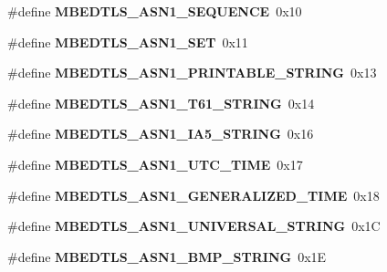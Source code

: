 \begin{DoxyCompactItemize}
\item 
\hypertarget{group__asn1__module_ga64ce838eb4418e69fe9aa251436203b3}{\#define {\bfseries M\-B\-E\-D\-T\-L\-S\-\_\-\-A\-S\-N1\-\_\-\-S\-E\-Q\-U\-E\-N\-C\-E}~0x10}\label{group__asn1__module_ga64ce838eb4418e69fe9aa251436203b3}

\item 
\hypertarget{group__asn1__module_ga67afaa83253889dacb9fcb47062162c5}{\#define {\bfseries M\-B\-E\-D\-T\-L\-S\-\_\-\-A\-S\-N1\-\_\-\-S\-E\-T}~0x11}\label{group__asn1__module_ga67afaa83253889dacb9fcb47062162c5}

\item 
\hypertarget{group__asn1__module_ga57f497984e573597e1ed100afcc3f965}{\#define {\bfseries M\-B\-E\-D\-T\-L\-S\-\_\-\-A\-S\-N1\-\_\-\-P\-R\-I\-N\-T\-A\-B\-L\-E\-\_\-\-S\-T\-R\-I\-N\-G}~0x13}\label{group__asn1__module_ga57f497984e573597e1ed100afcc3f965}

\item 
\hypertarget{group__asn1__module_gabe4ca1599521c0a3b4c54391906c2083}{\#define {\bfseries M\-B\-E\-D\-T\-L\-S\-\_\-\-A\-S\-N1\-\_\-\-T61\-\_\-\-S\-T\-R\-I\-N\-G}~0x14}\label{group__asn1__module_gabe4ca1599521c0a3b4c54391906c2083}

\item 
\hypertarget{group__asn1__module_ga30d5d0f805af50deb5820e741a53e481}{\#define {\bfseries M\-B\-E\-D\-T\-L\-S\-\_\-\-A\-S\-N1\-\_\-\-I\-A5\-\_\-\-S\-T\-R\-I\-N\-G}~0x16}\label{group__asn1__module_ga30d5d0f805af50deb5820e741a53e481}

\item 
\hypertarget{group__asn1__module_gac4e932ef9cdf9fa9b8fb152357c6ec64}{\#define {\bfseries M\-B\-E\-D\-T\-L\-S\-\_\-\-A\-S\-N1\-\_\-\-U\-T\-C\-\_\-\-T\-I\-M\-E}~0x17}\label{group__asn1__module_gac4e932ef9cdf9fa9b8fb152357c6ec64}

\item 
\hypertarget{group__asn1__module_ga29f746333b11a4d9e0b7624dcd982fdb}{\#define {\bfseries M\-B\-E\-D\-T\-L\-S\-\_\-\-A\-S\-N1\-\_\-\-G\-E\-N\-E\-R\-A\-L\-I\-Z\-E\-D\-\_\-\-T\-I\-M\-E}~0x18}\label{group__asn1__module_ga29f746333b11a4d9e0b7624dcd982fdb}

\item 
\hypertarget{group__asn1__module_gacdbc7c6bcf1b8eb158a52ed773f3cdf3}{\#define {\bfseries M\-B\-E\-D\-T\-L\-S\-\_\-\-A\-S\-N1\-\_\-\-U\-N\-I\-V\-E\-R\-S\-A\-L\-\_\-\-S\-T\-R\-I\-N\-G}~0x1\-C}\label{group__asn1__module_gacdbc7c6bcf1b8eb158a52ed773f3cdf3}

\item 
\hypertarget{group__asn1__module_ga577f12d1a059eb52928614c50f2bb0d8}{\#define {\bfseries M\-B\-E\-D\-T\-L\-S\-\_\-\-A\-S\-N1\-\_\-\-B\-M\-P\-\_\-\-S\-T\-R\-I\-N\-G}~0x1\-E}\label{group__asn1__module_ga577f12d1a059eb52928614c50f2bb0d8}


\end{DoxyCompactItemize}
